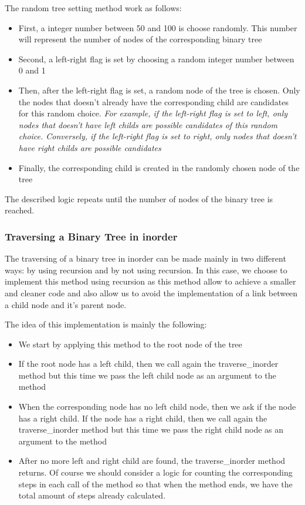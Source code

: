 \documentclass[12p]{article}
\begin{document}
The random tree setting method work as follows: 
\begin{itemize}
  \item First, a  integer number between 50 and 100 is choose randomly. This number will represent the number of nodes of the corresponding binary tree
  \item Second, a left-right flag is set by choosing a random integer number between 0 and 1
  \item Then, after the left-right flag is set, a random node of the tree is chosen. Only the nodes that doesn't already have the corresponding child are candidates for this random choice. \textit{For example, if the left-right flag is set to left, only nodes that doesn't have left childs are possible candidates of this random choice. Conversely, if the left-right flag is set to right, only nodes that doesn't have right childs are possible candidates}
  \item Finally, the corresponding child is created in the randomly chosen node of the tree
\end{itemize}

The described logic repeats until the number of nodes of the binary tree is reached.

  \subsubsection{Traversing a Binary Tree in inorder}
The traversing of a binary tree in inorder can be made mainly in two different ways: by using recursion and by not using recursion. In this case, we choose to implement this method using recursion as this method allow to achieve a smaller and cleaner code and also allow us to avoid the implementation of a link between a child node and it's parent node.

\bigskip

The idea of this implementation is mainly the following:
\begin{itemize}
  \item We start by applying this method to the root node of the tree
  \item If the root node has a left child, then we call again the traverse\_inorder method but this time we pass the left child node as an argument to the method
  \item When the corresponding node has no left child node, then we ask if the node has a right child. If the node has a right child, then we call again the traverse\_inorder method but this time we pass the right child node as an argument to the method
  \item After no more left and right child are found, the traverse\_inorder method returns. Of course we should consider a logic for counting the corresponding steps in each call of the method so that when the method ends, we have the total amount of steps already calculated.
\end{itemize}
\end{document}
